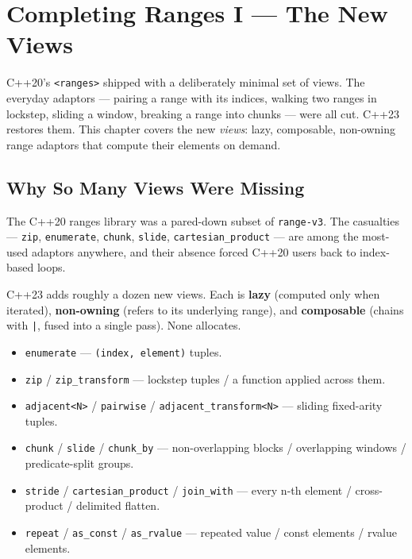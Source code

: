 \chapter{Completing Ranges I --- The New Views}
\label{ch:ranges-views}

C++20's \lstinline|<ranges>| shipped with a deliberately minimal set of views. The everyday adaptors --- pairing a range with its indices, walking two ranges in lockstep, sliding a window, breaking a range into chunks --- were all cut. C++23 restores them. This chapter covers the new \emph{views}: lazy, composable, non-owning range adaptors that compute their elements on demand.

\section{Why So Many Views Were Missing}

The C++20 ranges library was a pared-down subset of \lstinline|range-v3|. The casualties --- \lstinline|zip|, \lstinline|enumerate|, \lstinline|chunk|, \lstinline|slide|, \lstinline|cartesian_product| --- are among the most-used adaptors anywhere, and their absence forced C++20 users back to index-based loops.

C++23 adds roughly a dozen new views. Each is \textbf{lazy} (computed only when iterated), \textbf{non-owning} (refers to its underlying range), and \textbf{composable} (chains with \lstinline+|+, fused into a single pass). None allocates.

\begin{itemize}
    \item \lstinline|enumerate| --- \lstinline|(index, element)| tuples.
    \item \lstinline|zip| / \lstinline|zip_transform| --- lockstep tuples / a function applied across them.
    \item \lstinline|adjacent<N>| / \lstinline|pairwise| / \lstinline|adjacent_transform<N>| --- sliding fixed-arity tuples.
    \item \lstinline|chunk| / \lstinline|slide| / \lstinline|chunk_by| --- non-overlapping blocks / overlapping windows / predicate-split groups.
    \item \lstinline|stride| / \lstinline|cartesian_product| / \lstinline|join_with| --- every n-th element / cross-product / delimited flatten.
    \item \lstinline|repeat| / \lstinline|as_const| / \lstinline|as_rvalue| --- repeated value / const elements / rvalue elements.
\end{itemize}

